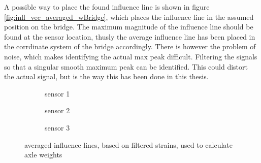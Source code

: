 % 		

A possible way to place the found influence line is shown in figure \ref{fig:infl_vec_averaged_wBridge}, which places the influence line in the assumed position on the bridge. The maximum magnitude of the influence line should be found at the sensor location, thusly the average influence line has been placed in the corrdinate system of the bridge accordingly. There is however the problem of noise, which makes identifying the actual max peak difficult.
Filtering the signals so that a singular smooth maximum peak can be identified. This could distort the actual signal, but is the way this has been done in this thesis.

\begin{figure}[h!]
	\begin{subfigure}[t]{0.8\textwidth}
		
		\caption{sensor 1}
		\label{fig:sensor1_averaged}
	\end{subfigure}
	\begin{subfigure}[t]{0.8\textwidth}
		
		\caption{sensor 2}
		\label{fig:sensor2_averaged}
	\end{subfigure}
	\begin{subfigure}[t]{0.8\textwidth}
		
		\caption{sensor 3}
		\label{fig:sensor3_averaged}
	\end{subfigure}
	\caption{averaged influence lines, based on filtered strains, used to calculate axle weights}
	\label{averaged_filtered_infl_lines}
\end{figure}
